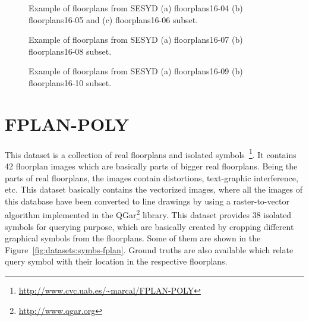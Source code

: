 \begin{figure}[h!]
\begin{center}
\subfloat{\texttt{[image: 04\_00]}}
\hspace{0.5mm}
\subfloat{\texttt{[image: 05\_00]}}
\hspace{0.5mm}
\subfloat{\texttt{[image: 06\_00]}}
\caption{Example of floorplans from SESYD (a) floorplans16-04 (b) floorplans16-05 and (c) floorplans16-06 subset.}
\end{center}
\end{figure}

\begin{figure}[h!]
\begin{center}
\subfloat{\texttt{[image: 07\_00]}}
\hspace{0.5mm}
\subfloat{\texttt{[image: 08\_00]}}
\caption{Example of floorplans from SESYD (a) floorplans16-07 (b) floorplans16-08 subset.}
\end{center}
\end{figure}

\begin{figure}[h!]
\begin{center}
\subfloat{\texttt{[image: 09\_00]}}
\hspace{0.5mm}
\subfloat{\texttt{[image: 10\_00]}}
\end{center}
\caption{Example of floorplans from SESYD (a) floorplans16-09 (b) floorplans16-10 subset.}
\label{fig:datasets:fps16-04}
\end{figure}

\section{FPLAN-POLY}
\label{sec:datasets:fplan}
This dataset is a collection of real floorplans and isolated symbols~\cite{Rusinol2009}\footnote{\url{http://www.cvc.uab.es/~marcal/FPLAN-POLY}}. It contains 42 floorplan images which are basically parts of bigger real floorplans. Being the parts of real floorplans, the images contain distortions, text-graphic interference, etc. This dataset basically contains the vectorized images, where all the images of this database have been converted to line drawings by using a raster-to-vector algorithm implemented in the QGar\footnote{\url{http://www.qgar.org}} library. This dataset provides 38 isolated symbols for querying purpose, which are basically created by cropping different graphical symbols from the floorplans. Some of them are shown in the Figure~\ref{fig:datasets:symbs-fplan}. Ground truths are also available which relate query symbol with their location in the respective floorplans.

